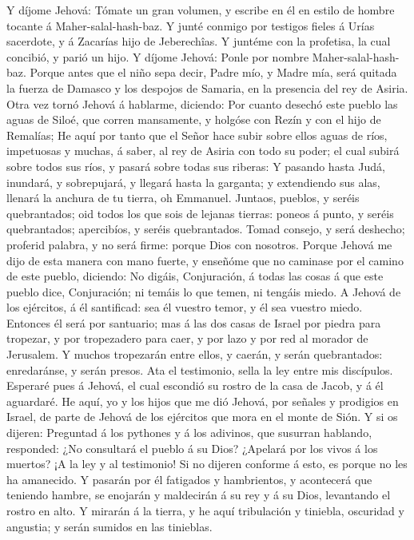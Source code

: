  Y díjome Jehová: Tómate un gran volumen, y escribe en él
en estilo de hombre tocante á Maher-salal-hash-baz.  Y
junté conmigo por testigos fieles á Urías sacerdote, y á Zacarías hijo
de Jeberechîas.  Y juntéme con la profetisa, la cual
concibió, y parió un hijo. Y díjome Jehová: Ponle por nombre
Maher-salal-hash-baz.  Porque antes que el niño sepa
decir, Padre mío, y Madre mía, será quitada la fuerza de Damasco y los
despojos de Samaria, en la presencia del rey de Asiria. 
Otra vez tornó Jehová á hablarme, diciendo:  Por cuanto
desechó este pueblo las aguas de Siloé, que corren mansamente, y holgóse
con Rezín y con el hijo de Remalías;  He aquí por tanto
que el Señor hace subir sobre ellos aguas de ríos, impetuosas y muchas,
á saber, al rey de Asiria con todo su poder; el cual subirá sobre todos
sus ríos, y pasará sobre todas sus riberas:  Y pasando
hasta Judá, inundará, y sobrepujará, y llegará hasta la garganta; y
extendiendo sus alas, llenará la anchura de tu tierra, oh Emmanuel.
 Juntaos, pueblos, y seréis quebrantados; oid todos los
que sois de lejanas tierras: poneos á punto, y seréis quebrantados;
apercibíos, y seréis quebrantados.  Tomad consejo, y será
deshecho; proferid palabra, y no será firme: porque Dios con nosotros.
 Porque Jehová me dijo de esta manera con mano fuerte, y
enseñóme que no caminase por el camino de este pueblo, diciendo:
 No digáis, Conjuración, á todas las cosas á que este
pueblo dice, Conjuración; ni temáis lo que temen, ni tengáis miedo.
 A Jehová de los ejércitos, á él santificad: sea él
vuestro temor, y él sea vuestro miedo.  Entonces él será
por santuario; mas á las dos casas de Israel por piedra para tropezar, y
por tropezadero para caer, y por lazo y por red al morador de Jerusalem.
 Y muchos tropezarán entre ellos, y caerán, y serán
quebrantados: enredaránse, y serán presos.  Ata el
testimonio, sella la ley entre mis discípulos.  Esperaré
pues á Jehová, el cual escondió su rostro de la casa de Jacob, y á él
aguardaré.  He aquí, yo y los hijos que me dió Jehová,
por señales y prodigios en Israel, de parte de Jehová de los ejércitos
que mora en el monte de Sión.  Y si os dijeren: Preguntad
á los pythones y á los adivinos, que susurran hablando, responded: ¿No
consultará el pueblo á su Dios? ¿Apelará por los vivos á los muertos?
 ¡A la ley y al testimonio! Si no dijeren conforme á
esto, es porque no les ha amanecido.  Y pasarán por él
fatigados y hambrientos, y acontecerá que teniendo hambre, se enojarán y
maldecirán á su rey y á su Dios, levantando el rostro en alto.
 Y mirarán á la tierra, y he aquí tribulación y tiniebla,
oscuridad y angustia; y serán sumidos en las tinieblas.

